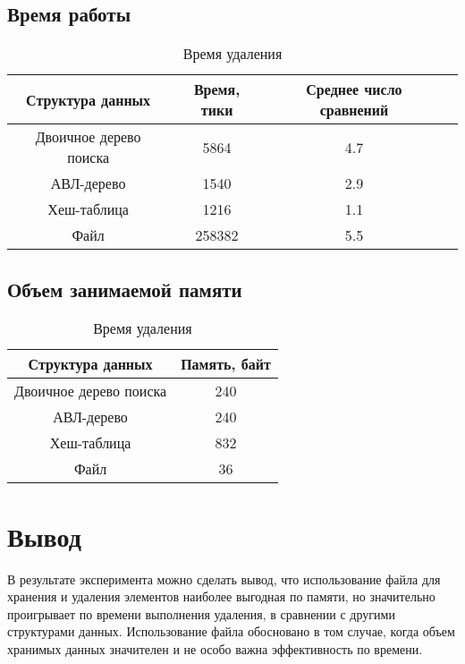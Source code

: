 \subsection{Время работы}

\begin{table}
    \begin{center}
        \caption{Время удаления}
        \begin{tabular}{|c|c|c|c|}
            \hline
            Структура данных & Время, тики & Среднее число сравнений \\
            \hline
            Двоичное дерево поиска & 5864 & 4.7 \\
            АВЛ-дерево & 1540 & 2.9 \\
            Хеш-таблица & 1216 & 1.1 \\
            Файл & 258382 & 5.5 \\
            \hline
        \end{tabular}
        \label{exp:delete}
    \end{center}
\end{table}

\subsection{Объем занимаемой памяти}

\begin{table}
    \begin{center}
        \caption{Время удаления}
        \begin{tabular}{|c|c|}
            \hline
            Структура данных & Память, байт \\
            \hline
            Двоичное дерево поиска & 240 \\
            АВЛ-дерево & 240 \\
            Хеш-таблица & 832 \\
            Файл & 36 \\
            \hline
        \end{tabular}
        \label{exp:delete}
    \end{center}
\end{table}

\section{Вывод}

В результате эксперимента можно сделать вывод, что использование файла для хранения и удаления элементов наиболее выгодная по памяти, но значительно проигрывает по времени выполнения удаления, в сравнении с другими структурами данных. Использование файла обосновано в том случае, когда объем хранимых данных значителен и не особо важна эффективность по времени.

